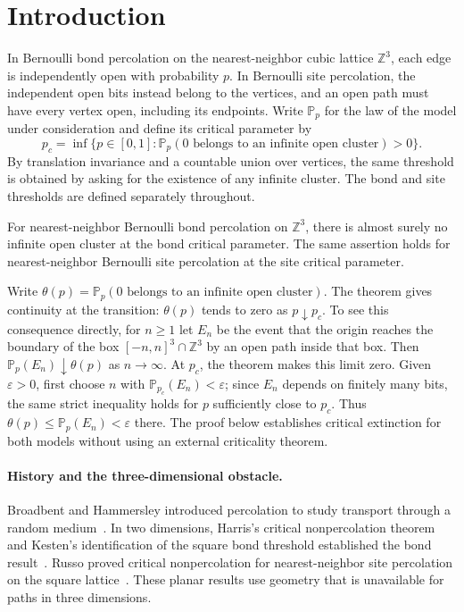 \section{Introduction}

In Bernoulli bond percolation on the nearest-neighbor cubic lattice
$\mathbb Z^3$, each edge is independently open with probability $p$.
In Bernoulli site percolation, the independent open bits instead belong to
the vertices, and an open path must have every vertex open, including its
endpoints. Write $\mathbb P_p$ for the law of the model under consideration
and define its critical parameter by
\[
 p_c=\inf\{p\in[0,1]:
       \mathbb P_p(0\text{ belongs to an infinite open cluster})>0\}.
\]
By translation invariance and a countable union over vertices, the same
threshold is obtained by asking for the existence of any infinite cluster.
The bond and site thresholds are defined separately throughout.

\begin{theorem}\label{thm:main}
For nearest-neighbor Bernoulli bond percolation on $\mathbb Z^3$, there is
almost surely no infinite open cluster at the bond critical parameter.
The same assertion holds for nearest-neighbor Bernoulli site percolation
at the site critical parameter.
\end{theorem}

Write $\theta(p)=\mathbb P_p(0\text{ belongs to an infinite open cluster})$.
The theorem gives continuity at the transition: $\theta(p)$ tends to
zero as $p\downarrow p_c$. To see this consequence directly, for $n\ge1$ let $E_n$ be
the event that the origin reaches the boundary of the box
$[-n,n]^3\cap\mathbb Z^3$ by an open path inside that box. Then
$\mathbb P_p(E_n)\downarrow\theta(p)$ as $n\to\infty$. At $p_c$, the
theorem makes this limit zero. Given $\varepsilon>0$, first choose $n$
with $\mathbb P_{p_c}(E_n)<\varepsilon$; since $E_n$ depends on finitely
many bits, the same strict inequality holds for $p$ sufficiently close
to $p_c$. Thus $\theta(p)\le\mathbb P_p(E_n)<\varepsilon$ there.
The proof below establishes critical extinction for both models without
using an external criticality theorem.

\paragraph{History and the three-dimensional obstacle.}
Broadbent and Hammersley introduced percolation to study transport through
a random medium~\cite{BroadbentHammersley1957}. In two dimensions, Harris's
critical nonpercolation theorem and Kesten's identification of the square
bond threshold established the bond result~\cite{Harris1960,Kesten1980}.
Russo proved critical nonpercolation for nearest-neighbor site percolation
on the square lattice~\cite[Theorem~2(b)]{Russo1981}. These planar results
use geometry that is unavailable for paths in three dimensions.

